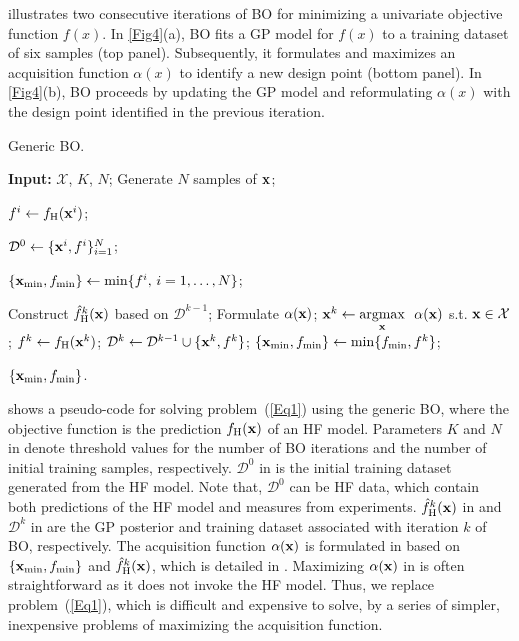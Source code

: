 \documentclass[iicol,sn-basic]{sn-jnl}%
\newcommand{\edit}[1]{\textcolor{red}{#1}} %
\begin{document}
 illustrates two consecutive iterations of BO for minimizing a univariate objective function $f(x)$.
In \cref{Fig4}(a), BO fits a GP model for $f(x)$ to a training dataset of six samples (top panel).
Subsequently, it formulates and maximizes an acquisition function $\alpha(x)$ to identify a new design point (bottom panel).
In \cref{Fig4}(b), BO proceeds by updating the GP model and reformulating $\alpha(x)$ with the design point identified in the previous iteration.

\begin{algorithm}
	\caption{Generic BO.}\label{Algo1}
	\begin{algorithmic}[1]
		\State \textbf{Input:} $\mathcal{X}$, $K$, $N$; \label{Algo1:1}
		\State Generate $N$ samples of ${\bf x}$; 
		
		\State $f^i \gets f_\text{H}({\bf x}^i)$; \textcolor{black}{}
		\EndFor
		
		\State $\mathcal{D}^0 \gets \{{\bf x}^i,f^i\}_{i=1}^N$; \label{Algo1:6}
		
		\State $\{{\bf x}_{\min},f_{\min}\} \gets \min\{f^i,\, i=1,\dots, N\}$;
		
		\State Construct $\hat{f}_\text{H}^k({\bf x})$ based on $\mathcal{D}^{k-1}$; \label{Algo1:9}
		\State Formulate $\alpha({\bf x})$; \label{Algo1:10}
		\State ${\bf x}^{k} \gets \underset{{\bf x}}{\mathrm{argmax}} \ \ \alpha({\bf x})$ s.t. ${\bf x} \in \mathcal{X}$; \label{Algo1:11}
		\State $f^{k} \gets f_\text{H}({\bf x}^{k})$;
		\textcolor{black}{} \label{Algo1:12}
		\State $\mathcal{D}^k\gets\mathcal{D}^{k-1} \cup \{{\bf x}^{k},f^{k}\}$; \label{Algo1:13}
		\State $\{{\bf x}_{\min},f_{\min}\} \gets \min\{f_{\min},f^{k}\}$;
		\EndFor
		
		\State \Return $\{{\bf x}_{\min},f_{\min}\}$.
	\end{algorithmic}
\end{algorithm}

 shows a pseudo-code for solving problem~(\ref{Eq1}) using the generic BO, where the objective function is the prediction $f_\text{H}(\bf x)$ of an HF model.
Parameters $K$ and $N$ in  denote threshold values for the number of BO iterations and the number of initial training samples, respectively.
$\mathcal{D}^{0}$ in  is the initial training dataset generated from the HF model.
Note that, $\mathcal{D}^{0}$ can be HF data, which contain both predictions of the HF model and measures from experiments.  
$\hat{f}_\text{H}^k({\bf x})$ in  and $\mathcal{D}^{k}$ in  are the GP posterior and training dataset associated with iteration $k$ of BO, respectively.
The acquisition function $\alpha({\bf x})$ is formulated in  based on $\{{\bf x}_{\min},f_{\min}\}$ and $\hat{f}_\text{H}^k({\bf x})$, which is detailed in .
Maximizing $\alpha({\bf x})$ in  is often straightforward as it does not invoke the HF model.
{Thus, we replace problem~(\ref{Eq1}), which is difficult and expensive to solve, by a series of simpler, inexpensive problems of maximizing the acquisition function.}
\end{document}

